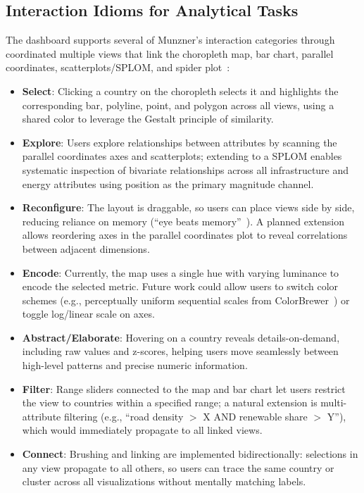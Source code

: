 \documentclass{vgtc}                          %
\begin{document}
\subsection{Interaction Idioms for Analytical Tasks}
The dashboard supports several of Munzner's interaction categories through coordinated multiple views that link the choropleth map, bar chart, parallel coordinates, scatterplots/SPLOM, and spider plot~\cite{roberts2007state}:

\begin{itemize}
    \item \textbf{Select}: Clicking a country on the choropleth selects it and highlights the corresponding bar, polyline, point, and polygon across all views, using a shared color to leverage the Gestalt principle of similarity.
    \item \textbf{Explore}: Users explore relationships between attributes by scanning the parallel coordinates axes and scatterplots; extending to a SPLOM enables systematic inspection of bivariate relationships across all infrastructure and energy attributes using position as the primary magnitude channel.
    \item \textbf{Reconfigure}: The layout is draggable, so users can place views side by side, reducing reliance on memory (``eye beats memory''~\cite{munzner2014visualization}). A planned extension allows reordering axes in the parallel coordinates plot to reveal correlations between adjacent dimensions.
    \item \textbf{Encode}: Currently, the map uses a single hue with varying luminance to encode the selected metric. Future work could allow users to switch color schemes (e.g., perceptually uniform sequential scales from ColorBrewer~\cite{brewer2003colorbrewer}) or toggle log/linear scale on axes.
    \item \textbf{Abstract/Elaborate}: Hovering on a country reveals details-on-demand, including raw values and z-scores, helping users move seamlessly between high-level patterns and precise numeric information.
    \item \textbf{Filter}: Range sliders connected to the map and bar chart let users restrict the view to countries within a specified range; a natural extension is multi-attribute filtering (e.g., ``road density $>$ X AND renewable share $>$ Y''), which would immediately propagate to all linked views.
    \item \textbf{Connect}: Brushing and linking are implemented bidirectionally: selections in any view propagate to all others, so users can trace the same country or cluster across all visualizations without mentally matching labels.
\end{itemize}
\end{document}
